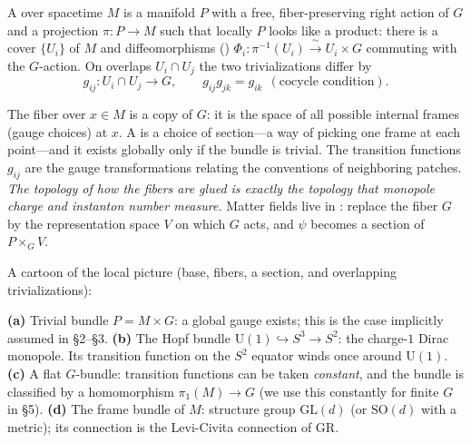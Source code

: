 \documentclass[11pt]{article}
\newcommand{\Uone}{\mathrm{U}(1)}
\begin{document}
\begin{ddefinition}
A  over spacetime $M$ is a manifold $P$ with a free,
fiber-preserving right action of $G$ and a projection $\pi:P\to M$ such that locally
$P$ looks like a product: there is a cover $\{U_i\}$ of $M$ and diffeomorphisms
() $\Phi_i:\pi^{-1}(U_i)\xrightarrow{\;\sim\;}U_i\times G$
commuting with the $G$-action. On overlaps $U_i\cap U_j$ the two trivializations differ
by 
\[
g_{ij}:U_i\cap U_j \to G,\qquad
g_{ij}g_{jk}=g_{ik}\ \ (\text{cocycle condition}).
\]
\end{ddefinition}

\begin{iintuition}
The fiber over $x\in M$ is a copy of $G$: it is the space of all possible internal
frames (gauge choices) at $x$. A  is a choice of section---a way of picking
one frame at each point---and it exists globally only if the bundle is trivial. The
transition functions $g_{ij}$ are the gauge transformations relating the conventions of
neighboring patches. \emph{The topology of how the fibers are glued is exactly the
topology that monopole charge and instanton number measure.} Matter fields live in
: replace the fiber $G$ by the representation space $V$ on
which $G$ acts, and $\psi$ becomes a section of $P\times_G V$.
\end{iintuition}

A cartoon of the local picture (base, fibers, a section, and overlapping trivializations):

\begin{center}
\end{center}

\begin{eexample}
\textbf{(a)} Trivial bundle $P=M\times G$: a global gauge exists; this is the case
implicitly assumed in \S2--\S3. \textbf{(b)} The Hopf bundle
$\Uone\hookrightarrow S^3\to S^2$: the charge-$1$ Dirac monopole. Its transition
function on the $S^2$ equator winds once around $\Uone$. \textbf{(c)} A flat
$G$-bundle: transition functions can be taken \emph{constant}, and the bundle is
classified by a homomorphism $\pi_1(M)\to G$ (we use this constantly for finite $G$ in
\S5). \textbf{(d)} The frame bundle of $M$: structure group $\mathrm{GL}(d)$ (or
$\mathrm{SO}(d)$ with a metric); its connection is the Levi-Civita connection of GR.
\end{eexample}
\end{document}

